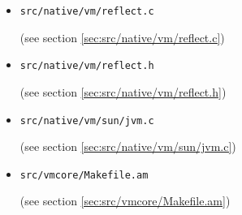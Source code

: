 \documentclass[a4paper, 10pt, titlepage]{scrartcl} %
\begin{document}
\begin{itemize}
 \item \begin{scriptsize}\verb|src|\hspace{0.0pt}\verb|/|\hspace{0.0pt}\verb|native|\hspace{0.0pt}\verb|/|\hspace{0.0pt}\verb|vm|\hspace{0.0pt}\verb|/|\hspace{0.0pt}\verb|reflect|\hspace{0.0pt}\verb|.|\hspace{0.0pt}\verb|c|\end{scriptsize} (see section \ref{sec:src/native/vm/reflect.c})
 \item \begin{scriptsize}\verb|src|\hspace{0.0pt}\verb|/|\hspace{0.0pt}\verb|native|\hspace{0.0pt}\verb|/|\hspace{0.0pt}\verb|vm|\hspace{0.0pt}\verb|/|\hspace{0.0pt}\verb|reflect|\hspace{0.0pt}\verb|.|\hspace{0.0pt}\verb|h|\end{scriptsize} (see section \ref{sec:src/native/vm/reflect.h})
 \item \begin{scriptsize}\verb|src|\hspace{0.0pt}\verb|/|\hspace{0.0pt}\verb|native|\hspace{0.0pt}\verb|/|\hspace{0.0pt}\verb|vm|\hspace{0.0pt}\verb|/|\hspace{0.0pt}\verb|sun|\hspace{0.0pt}\verb|/|\hspace{0.0pt}\verb|jvm|\hspace{0.0pt}\verb|.|\hspace{0.0pt}\verb|c|\end{scriptsize} (see section \ref{sec:src/native/vm/sun/jvm.c})
 \item \begin{scriptsize}\verb|src|\hspace{0.0pt}\verb|/|\hspace{0.0pt}\verb|vmcore|\hspace{0.0pt}\verb|/|\hspace{0.0pt}\verb|Makefile|\hspace{0.0pt}\verb|.|\hspace{0.0pt}\verb|am|\end{scriptsize} (see section \ref{sec:src/vmcore/Makefile.am})

\end{itemize}
\end{document}
